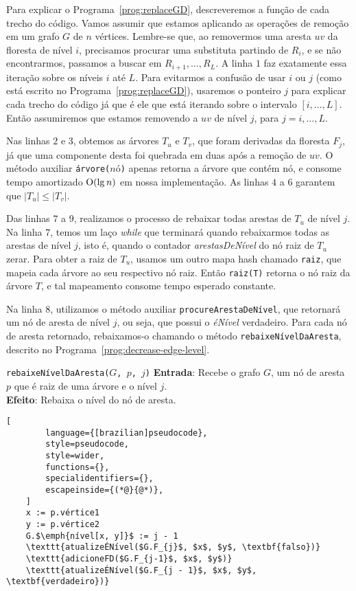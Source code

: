 Para explicar o Programa~\ref{prog:replaceGD}, descreveremos a função de cada trecho do código. Vamos assumir que estamos aplicando as operações de remoção em um grafo $G$ de $n$ vértices. Lembre-se que, ao removermos uma aresta $uv$ da floresta de nível $i$, precisamos procurar uma substituta partindo de $R_i$, e se não encontrarmos, passamos a buscar em $R_{i + 1}, \ldots, R_L$. A linha $1$ faz exatamente essa iteração sobre os níveis $i$ até $L$. Para evitarmos a confusão de usar $i$ ou $j$ (como está escrito no Programa~\ref{prog:replaceGD}), usaremos o ponteiro $j$ para explicar cada trecho do código já que é ele que está iterando sobre o intervalo $[i, \ldots, L]$. Então assumiremos que estamos removendo a $uv$ de nível $j$, para $j = i, \ldots , L$.

Nas linhas $2$ e $3$, obtemos as árvores $T_u$ e $T_v$, que foram derivadas da floresta $F_j$, já que uma componente desta foi quebrada em duas após a remoção de $uv$. O método auxiliar \texttt{árvore($\textit{nó}$)} apenas retorna a árvore que contém nó, e consome tempo amortizado $\mathrm{O}(\lg n)$ em nossa implementação. As linhas $4$ a $6$ garantem que $|T_u| \leq |T_v|$. 

Das linhas $7$ a $9$, realizamos o processo de rebaixar todas arestas de $T_u$ de nível $j$. Na linha $7$, temos um laço \textit{while} que terminará quando rebaixarmos todas as arestas de nível $j$, isto é, quando o contador \textit{arestasDeNível} do nó raiz de $T_u$ zerar. Para obter a raiz de $T_u$, usamos um outro mapa hash chamado \texttt{raiz}, que mapeia cada árvore ao seu respectivo nó raiz. Então \texttt{raiz(T)} retorna o nó raiz da árvore $T$, e tal mapeamento consome tempo esperado constante.

Na linha $8$, utilizamos o método auxiliar \texttt{procureArestaDeNível}, que retornará um nó de aresta de nível $j$, ou seja, que possui o \textit{éNível} verdadeiro. Para cada nó de aresta retornado, rebaixamos-o chamando o método \texttt{rebaixeNívelDaAresta}, descrito no Programa~\ref{prog:decrease-edge-level}.


\begin{programruledcaption}{\texttt{rebaixeNívelDaAresta($G$, $p$, $j$)} \label{prog:decrease-edge-level}}
    \noindent\textbf{Entrada}: Recebe o grafo $G$, um nó de aresta $p$ que é raiz de uma árvore e o nível $j$.\\
    \textbf{Efeito}: Rebaixa o nível do nó de aresta.
    \vspace{-0.5\baselineskip}
    \begin{lstlisting}[
        language={[brazilian]pseudocode},
        style=pseudocode,
        style=wider,
        functions={},
        specialidentifiers={},
        escapeinside={(*@}{@*)},
    ]
    x := p.vértice1
    y := p.vértice2
    G.$\emph{nível[x, y]}$ := j - 1
    \texttt{atualizeÉNível($G.F_{j}$, $x$, $y$, \textbf{falso})}
    \texttt{adicioneFD($G.F_{j-1}$, $x$, $y$)}
    \texttt{atualizeÉNível($G.F_{j - 1}$, $x$, $y$, \textbf{verdadeiro})}

    \end{lstlisting}
    \vspace{-0.5\baselineskip}
\end{programruledcaption}

